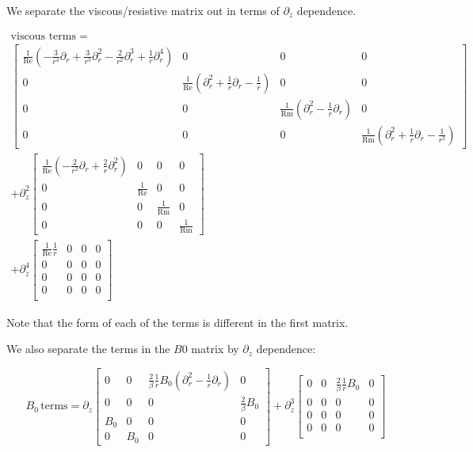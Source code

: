 \documentclass{paper}
\newcommand{\beq}{\begin{equation}}
\newcommand{\eeq}{\end{equation}}
\newcommand\reye{\mathrm{Re}}
\newcommand\reym{\mathrm{Rm}}
\begin{document}
We separate the viscous/resistive matrix out in terms of $\partial_z$ dependence.

\begin{multline}
\mathrm{viscous}\, \,\mathrm{terms}  = \\
 \left[\begin{matrix}
\frac{1}{\reye} \left(-\frac{3}{r^4} \partial_r + \frac{3}{r^3} \partial_r^2 - \frac{2}{r^2} \partial_r^3 + \frac{1}{r} \partial_r^4\right) & 0 & 0 & 0\\
0 & \frac{1}{\reye} \left(\partial_r^2 + \frac{1}{r} \partial_r - \frac{1}{r} \right) & 0 & 0 \\
0 & 0 & \frac{1}{\reym} \left(\partial_r^2 - \frac{1}{r} \partial_r\right) & 0 \\
0 & 0 & 0 & \frac{1}{\reym} \left(\partial_r^2 + \frac{1}{r}\partial_r - \frac{1}{r^2}\right)
\end{matrix}\right] \\
+
\partial_z^2 \left[\begin{matrix}
\frac{1}{\reye}\left(-\frac{2}{r^2}\partial_r + \frac{2}{r}\partial_r^2\right) & 0 & 0 & 0 \\
0 & \frac{1}{\reye} & 0 & 0 \\
0 & 0 & \frac{1}{\reym} & 0 \\
0 & 0 & 0 & \frac{1}{\reym}
\end{matrix}\right] \\
+
\partial_z^4\left[\begin{matrix}
\frac{1}{\reye}\frac{1}{r} & 0 & 0 & 0 \\
0 & 0 & 0 & 0 \\
0 & 0 & 0 & 0 \\
0 & 0 & 0 & 0 \\
\end{matrix}\right]
\end{multline}

Note that the form of each of the terms is different in the first matrix.

We also separate the terms in the $B0$ matrix by $\partial_z$ dependence:

\beq
B_0 \, \mathrm{terms} = 
\partial_z \left[\begin{matrix}
0 & 0 & \frac{2}{\beta} \frac{1}{r} B_0 \left(\partial_r^2 - \frac{1}{r}\partial_r\right) & 0 \\
0 & 0 & 0 & \frac{2}{\beta}B_0\\
B_0 & 0 & 0 & 0\\
0 & B_0 & 0 & 0
\end{matrix}\right] 
+
\partial_z^3 \left[\begin{matrix}
0 & 0 & \frac{2}{\beta} \frac{1}{r} B_0 & 0 \\
0 & 0 & 0 & 0 \\
0 & 0 & 0 & 0 \\
0 & 0 & 0 & 0 \\
\end{matrix}\right]
\eeq
\end{document}

